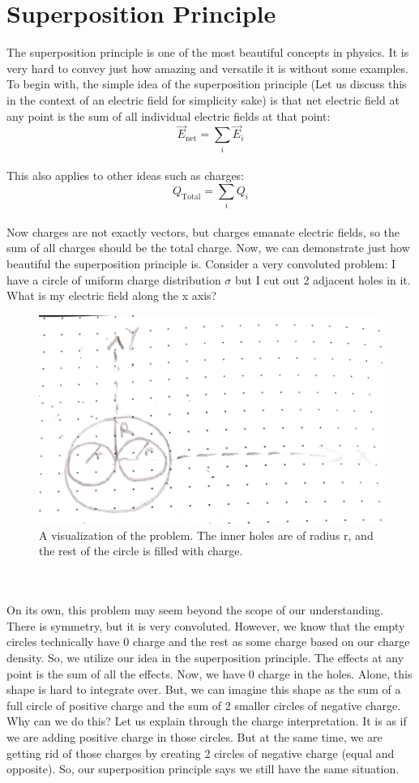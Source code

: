 \documentclass{article}
\begin{document}
\section{Superposition Principle}
The superposition principle is one of the most beautiful concepts in physics. It is very hard to convey just how amazing and versatile it is without some examples. To begin with, the simple idea of the superposition principle (Let us discuss this in the context of an electric field for simplicity sake) is that net electric field at any point is the sum of all individual electric fields at that point:\\
\begin{equation*}
	\vec{E}_{\text{net}} = \sum\limits_{i} \vec{E}_i
\end{equation*}\\
This also applies to other ideas such as charges:\\
\begin{equation*}
	Q_\text{Total} = \sum\limits_{i} Q_i
\end{equation*}\\
Now charges are not exactly vectors, but charges emanate electric fields, so the sum of all charges should be the total charge. Now, we can demonstrate just how beautiful the superposition principle is. Consider a very convoluted problem: I have a circle of uniform charge distribution $\sigma$ but I cut out 2 adjacent holes in it. What is my electric field along the x axis?\\
\begin{figure}[ht]
\center
\includegraphics[width=.4\textwidth]{Superposition1.jpg}
\caption{A visualization of the problem. The inner holes are of radius r, and the rest of the circle is filled with charge.}
\end{figure}\\
\\
On its own, this problem may seem beyond the scope of our understanding. There is symmetry, but it is very convoluted. However, we know that the empty circles technically have 0 charge and the rest as some charge based on our charge density. So, we utilize our idea in the superposition principle. The effects at any point is the sum of all the effects. Now, we have 0 charge in the holes. Alone, this shape is hard to integrate over. But, we can imagine this shape as the sum of a full circle of positive charge and the sum of 2 smaller circles of negative charge. Why can we do this? Let us explain through the charge interpretation. It is as if we are adding positive charge in those circles. But at the same time, we are getting rid of those charges by creating 2 circles of negative charge (equal and opposite). So, our superposition principle says we still have the same situation.\\
\end{document}
